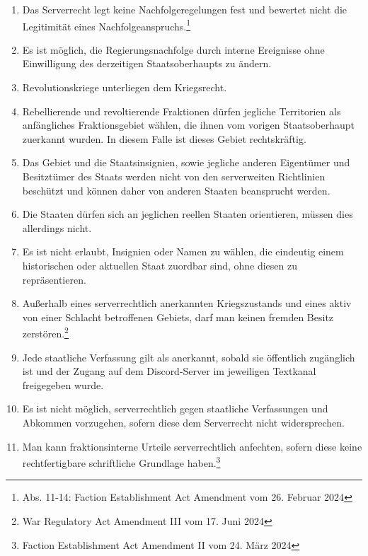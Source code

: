 \documentclass{article}
\begin{document}
\begin{enumerate}[(1)]
	\item Das Serverrecht legt keine Nachfolgeregelungen fest und bewertet nicht die Legitimität eines Nachfolgeanspruchs.\footnote{Abs. 11-14: Faction Establishment Act Amendment vom 26. Februar 2024}
	\item Es ist möglich, die Regierungsnachfolge durch interne Ereignisse ohne Einwilligung des derzeitigen Staatsoberhaupts zu ändern.
	\item Revolutionskriege unterliegen dem Kriegsrecht.
	\item Rebellierende und revoltierende Fraktionen dürfen jegliche Territorien als anfängliches Fraktionsgebiet wählen, die ihnen vom vorigen Staatsoberhaupt zuerkannt wurden. In diesem Falle ist dieses Gebiet rechtskräftig.
    \item Das Gebiet und die Staatsinsignien, sowie jegliche anderen Eigentümer und Besitztümer des Staats werden nicht von den serverweiten Richtlinien beschützt und können daher von anderen Staaten beansprucht werden.
    \item Die Staaten dürfen sich an jeglichen reellen Staaten orientieren, müssen dies allerdings nicht.
    \item Es ist nicht erlaubt, Insignien oder Namen zu wählen, die eindeutig einem historischen oder aktuellen Staat zuordbar sind, ohne diesen zu repräsentieren.	
    \item Außerhalb eines serverrechtlich anerkannten Kriegszustands und eines aktiv von einer Schlacht betroffenen Gebiets, darf man keinen fremden Besitz zerstören.\footnote{War Regulatory Act Amendment III vom 17. Juni 2024}
    \item Jede staatliche Verfassung gilt als anerkannt, sobald sie öffentlich zugänglich ist und der Zugang auf dem Discord-Server im jeweiligen Textkanal freigegeben wurde.
    \item Es ist nicht möglich, serverrechtlich gegen staatliche Verfassungen und Abkommen vorzugehen, sofern diese dem Serverrecht nicht widersprechen.
    \item Man kann fraktionsinterne Urteile serverrechtlich anfechten, sofern diese keine rechtfertigbare schriftliche Grundlage haben.\footnote{Faction Establishment Act Amendment II vom 24. März 2024}
\end{enumerate}
\end{document}
